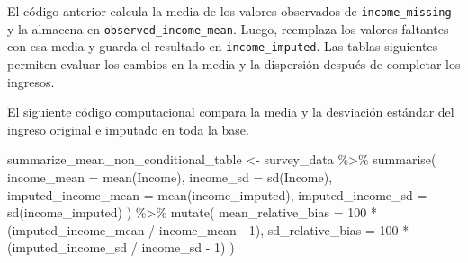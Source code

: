 \documentclass[
  spanish,
  11pt,
  letterpaper,
  oneside,
  open=any]{scrbook}
\newenvironment{Shaded}{\begin{snugshade}}{\end{snugshade}}
\newcommand{\AttributeTok}[1]{\textcolor[rgb]{0.40,0.45,0.13}{#1}}
\newcommand{\DecValTok}[1]{\textcolor[rgb]{0.68,0.00,0.00}{#1}}
\newcommand{\FunctionTok}[1]{\textcolor[rgb]{0.28,0.35,0.67}{#1}}
\newcommand{\NormalTok}[1]{\textcolor[rgb]{0.00,0.23,0.31}{#1}}
\newcommand{\OtherTok}[1]{\textcolor[rgb]{0.00,0.23,0.31}{#1}}
\newcommand{\SpecialCharTok}[1]{\textcolor[rgb]{0.37,0.37,0.37}{#1}}
\begin{document}
El código anterior calcula la media de los valores observados de
\texttt{income\_missing} y la almacena en
\texttt{observed\_income\_mean}. Luego, reemplaza los valores faltantes
con esa media y guarda el resultado en \texttt{income\_imputed}. Las
tablas siguientes permiten evaluar los cambios en la media y la
dispersión después de completar los ingresos.

El siguiente código computacional compara la media y la desviación
estándar del ingreso original e imputado en toda la base.

\begin{Shaded}
\begin{Highlighting}[]
\NormalTok{summarize\_mean\_non\_conditional\_table }\OtherTok{\textless{}{-}}\NormalTok{ survey\_data }\SpecialCharTok{\%\textgreater{}\%}
  \FunctionTok{summarise}\NormalTok{(}
    \AttributeTok{income\_mean =} \FunctionTok{mean}\NormalTok{(Income),}
    \AttributeTok{income\_sd =} \FunctionTok{sd}\NormalTok{(Income),}
    \AttributeTok{imputed\_income\_mean =} \FunctionTok{mean}\NormalTok{(income\_imputed),}
    \AttributeTok{imputed\_income\_sd =} \FunctionTok{sd}\NormalTok{(income\_imputed)}
\NormalTok{  ) }\SpecialCharTok{\%\textgreater{}\%}
  \FunctionTok{mutate}\NormalTok{(}
    \AttributeTok{mean\_relative\_bias =} \DecValTok{100} \SpecialCharTok{*}\NormalTok{ (imputed\_income\_mean }\SpecialCharTok{/}\NormalTok{ income\_mean }\SpecialCharTok{{-}} \DecValTok{1}\NormalTok{),}
    \AttributeTok{sd\_relative\_bias =} \DecValTok{100} \SpecialCharTok{*}\NormalTok{ (imputed\_income\_sd }\SpecialCharTok{/}\NormalTok{ income\_sd }\SpecialCharTok{{-}} \DecValTok{1}\NormalTok{)}
\NormalTok{  )}
\end{Highlighting}
\end{Shaded}
\end{document}
